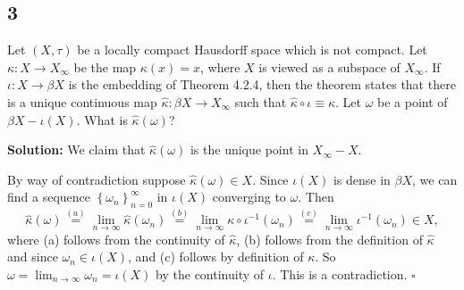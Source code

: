 \documentclass[12pt]{article}
\newcounter{ProofCounter}
\newenvironment{Solution}{\stepcounter{ProofCounter}\textbf{Solution:}}{\hfill$\square$}
\begin{document}
\subsection*{3}
\begin{tcolorbox}
  Let $(X, \tau)$ be a locally compact Hausdorff space which is not compact. 
  Let $\kappa : X \rightarrow X_{\infty}$ be the map $\kappa(x) = x$, where $X$ is viewed as a subspace of $X_{\infty}$. If $\iota: X \rightarrow \beta
  X$ is the embedding of Theorem 4.2.4, then the theorem states that there is a unique continuous map $\hat{\kappa} : \beta X \rightarrow X_{\infty}$
  such that $\hat{\kappa} \circ \iota \equiv \kappa$. Let $\omega$ be a point of $\beta X - \iota(X)$. What is $\hat{\kappa}(\omega)$?
\end{tcolorbox}
\begin{Solution}
  We claim that $\hat{\kappa}(\omega)$ is the unique point in $X_{\infty} - X$.

  By way of contradiction suppose $\hat{\kappa}(\omega) \in X$.
  Since $\iota(X)$ is dense in $\beta X$, we can find a sequence $\left\{ \omega_{n} \right\}_{n=0}^{\infty}$ in $\iota(X)$ converging to $\omega$.
  Then
  \[
    \hat{\kappa}(\omega) \stackrel{(a)}{=} \lim_{n\rightarrow\infty}\hat{\kappa}(\omega_n) \stackrel{(b)}{=} \lim_{n\rightarrow\infty}\kappa\circ
    \iota^{-1}(\omega_n) \stackrel{(c)}{=}
    \lim_{n\rightarrow\infty}\iota^{-1}(\omega_n) \in X,
  \]
  where (a) follows from the continuity of $\hat{\kappa}$, (b) follows from the definition of $\hat{\kappa}$ and since $\omega_n \in \iota(X)$, and
  (c) follows by definition of $\kappa$.
  So $\omega = \lim_{n\rightarrow\infty} \omega_n = \iota(X)$ by the continuity of $\iota$. This is a contradiction.
\end{Solution}
\end{document}
